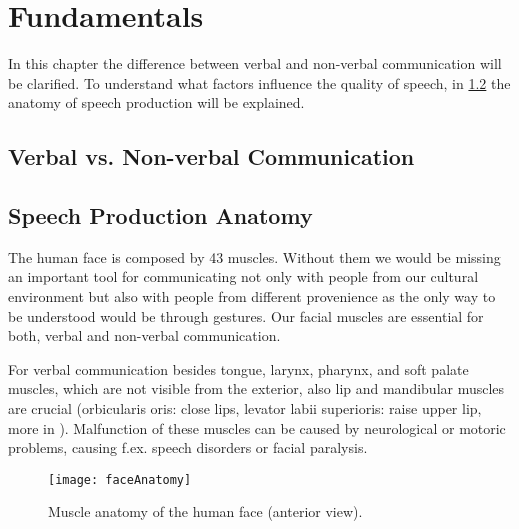 \chapter{Fundamentals}
\label{cha:fundamentals}

In this chapter the difference between verbal and non-verbal communication will be clarified. To understand what factors influence the quality of speech, in \ref{sec:anatomy} the anatomy of speech production will be explained.  



\section{Verbal vs. Non-verbal Communication} %
\label{sec:communication}


\section{Speech Production Anatomy} %
\label{sec:anatomy}

The human face is composed by 43 muscles. Without them we would be missing an important tool for communicating not only with people from our cultural environment but also with people from different provenience as the only way to be understood would be through gestures. Our facial muscles are essential for both, verbal and non-verbal communication.\par 
For verbal communication besides tongue, larynx, pharynx, and soft palate muscles, which are not visible from the exterior, also lip and mandibular muscles are crucial (orbicularis oris: close lips, levator labii superioris: raise upper lip, more in \cite{PhonManual}). 
Malfunction of these muscles can be caused by neurological or motoric problems, causing f.ex. speech disorders or facial paralysis. 


\begin{figure}
    \centering
    \texttt{[image: faceAnatomy]}
    \caption{Muscle anatomy of the human face (anterior view).\cite{FaceMuscles}}
    \label{fig:my_label}
\end{figure}

